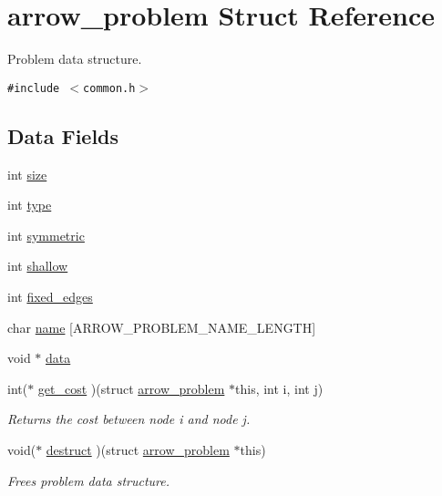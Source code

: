 \hypertarget{structarrow__problem}{
\section{arrow\_\-problem Struct Reference}
\label{structarrow__problem}
}
Problem data structure.  


{\tt \#include $<$common.h$>$}

\subsection*{Data Fields}
\begin{CompactItemize}
\item 
int \hyperlink{structarrow__problem_de8573ddc391d06b08b65923fca693ec}{size}
\item 
int \hyperlink{structarrow__problem_42c44f8d75c6e7a1c7440ac472b8594b}{type}
\item 
int \hyperlink{structarrow__problem_168ab92e9d7a873740a2550f4d3510d9}{symmetric}
\item 
int \hyperlink{structarrow__problem_8c3f4f7794c1430440658d69151b296d}{shallow}
\item 
int \hyperlink{structarrow__problem_9d9b48847d1d9cc2d776da04d476f3a6}{fixed\_\-edges}
\item 
char \hyperlink{structarrow__problem_8b7fec7ddd0462d3d841b87e287cff9f}{name} \mbox{[}ARROW\_\-PROBLEM\_\-NAME\_\-LENGTH\mbox{]}
\item 
void $\ast$ \hyperlink{structarrow__problem_6dbeb0f93e110adf45096c7457cd588d}{data}
\item 
int($\ast$ \hyperlink{structarrow__problem_4f1f4c9ef90f240b248e8f39360da769}{get\_\-cost} )(struct \hyperlink{structarrow__problem}{arrow\_\-problem} $\ast$this, int i, int j)
\begin{CompactList}\small\item\em Returns the cost between node i and node j. \item\end{CompactList}\item 
void($\ast$ \hyperlink{structarrow__problem_ff7c7873a7e7130a16e2a49da20ee625}{destruct} )(struct \hyperlink{structarrow__problem}{arrow\_\-problem} $\ast$this)
\begin{CompactList}\small\item\em Frees problem data structure. \item\end{CompactList}\end{CompactItemize}


